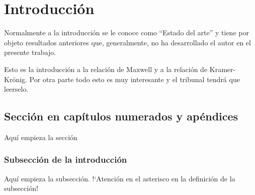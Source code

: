 \chapter{Introducción}
\graphicspath{{figuras/int/}}
\label{cap:introd}

Normalmente a la introducción se le conoce como ``Estado del arte'' y tiene por objeto resultados anteriores que, generalmente, no ha desarrollado el autor en el presente trabajo.

Esto es la introducción a la relación de Maxwell y a la relación de Kramer-Krönig. Por otra parte todo esto es muy interesante y el tribunal tendrá que leerselo.


\section{Sección en capítulos numerados y apéndices}

Aquí empieza la sección

\subsection*{Subsección de la introducción}

Aquí empieza la subsección. !`Atención en el asterisco en la definición de la subsección!
